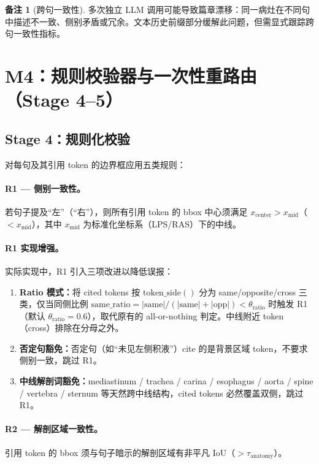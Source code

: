 \documentclass[11pt,a4paper]{article}
\theoremstyle{definition}
\newtheorem{remark}{备注}[section]
\begin{document}
\begin{remark}[跨句一致性]
多次独立 LLM 调用可能导致篇章漂移：同一病灶在不同句中描述不一致、侧别矛盾或冗余。文本历史前缀部分缓解此问题，但需显式跟踪跨句一致性指标。
\end{remark}


\section{M4：规则校验器与一次性重路由（Stage 4--5）}

\subsection{Stage 4：规则化校验}

对每句及其引用 token 的边界框应用五类规则：

\paragraph{R1 --- 侧别一致性。}
若句子提及``左''（``右''），则所有引用 token 的 bbox 中心须满足 $x_{\mathrm{center}} > x_{\mathrm{mid}}$（$< x_{\mathrm{mid}}$），其中 $x_{\mathrm{mid}}$ 为标准化坐标系（LPS/RAS）下的中线。

\paragraph{R1 实现增强。}
实际实现中，R1 引入三项改进以降低误报：
\begin{enumerate}[nosep]
    \item \textbf{Ratio 模式：}将 cited tokens 按 $\mathrm{token\_side}()$ 分为 same/opposite/cross 三类，仅当同侧比例 $\mathrm{same\_ratio} = |\mathrm{same}| / (|\mathrm{same}| + |\mathrm{opp}|) < \theta_{\mathrm{ratio}}$ 时触发 R1（默认 $\theta_{\mathrm{ratio}} = 0.6$），取代原有的 all-or-nothing 判定。中线附近 token（cross）排除在分母之外。
    \item \textbf{否定句豁免：}否定句（如``未见左侧积液''）cite 的是背景区域 token，不要求侧别一致，跳过 R1。
    \item \textbf{中线解剖词豁免：}mediastinum / trachea / carina / esophagus / aorta / spine / vertebra / sternum 等天然跨中线结构，cited tokens 必然覆盖双侧，跳过 R1。
\end{enumerate}

\paragraph{R2 --- 解剖区域一致性。}
引用 token 的 bbox 须与句子暗示的解剖区域有非平凡 IoU（$> \tau_{\mathrm{anatomy}}$）。
\end{document}
